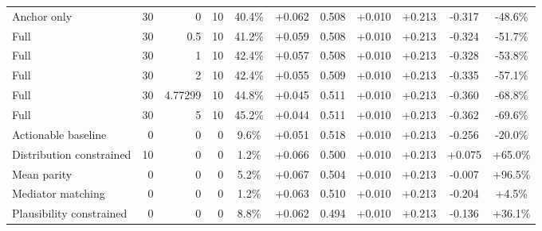 \begin{table}[htbp]
\begin{tabular}{lrrrccccccc}
Anchor only & 30 & 0 & 10 & 40.4\% & +0.062 & 0.508 & +0.010 & +0.213 & -0.317 & -48.6\% \\
Full & 30 & 0.5 & 10 & 41.2\% & +0.059 & 0.508 & +0.010 & +0.213 & -0.324 & -51.7\% \\
Full & 30 & 1 & 10 & 42.4\% & +0.057 & 0.508 & +0.010 & +0.213 & -0.328 & -53.8\% \\
Full & 30 & 2 & 10 & 42.4\% & +0.055 & 0.509 & +0.010 & +0.213 & -0.335 & -57.1\% \\
Full & 30 & 4.77299 & 10 & 44.8\% & +0.045 & 0.511 & +0.010 & +0.213 & -0.360 & -68.8\% \\
Full & 30 & 5 & 10 & 45.2\% & +0.044 & 0.511 & +0.010 & +0.213 & -0.362 & -69.6\% \\
Actionable baseline & 0 & 0 & 0 & 9.6\% & +0.051 & 0.518 & +0.010 & +0.213 & -0.256 & -20.0\% \\
Distribution constrained & 10 & 0 & 0 & 1.2\% & +0.066 & 0.500 & +0.010 & +0.213 & +0.075 & +65.0\% \\
Mean parity & 0 & 0 & 0 & 5.2\% & +0.067 & 0.504 & +0.010 & +0.213 & -0.007 & +96.5\% \\
Mediator matching & 0 & 0 & 0 & 1.2\% & +0.063 & 0.510 & +0.010 & +0.213 & -0.204 & +4.5\% \\
Plausibility constrained & 0 & 0 & 0 & 8.8\% & +0.062 & 0.494 & +0.010 & +0.213 & -0.136 & +36.1\% \\
\bottomrule
\end{tabular}
\end{table}